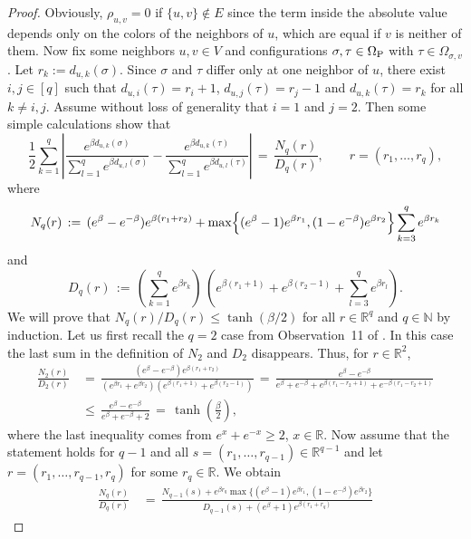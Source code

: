 \documentclass{dis}
\theoremstyle{citing}
\begin{document}
\begin{proof}
Obviously, $\rho_{u,v}=0$ if $\{u,v\}\notin E$ since the term 
inside the absolute value depends only on the colors of the 
neighbors of $u$, which are equal if $v$ is neither of them.
Now fix some neighbors $u,v\in V$ and configurations 
$\sigma,\tau\in{{\Omega}_{\rm P}}$ with $\tau\in{\Omega}_{\sigma,v}$.
Let $r_k:=d_{u,k}(\sigma)$. Since $\sigma$ and $\tau$ differ only 
at one neighbor of $u$, there exist $i,j\in[q]$ such that 
$d_{u,i}(\tau)=r_i+1$, $d_{u,j}(\tau)=r_j-1$ and 
$d_{u,k}(\tau)=r_k$ for all $k\neq i,j$. 
Assume without loss of generality that $i=1$ and $j=2$. Then some simple 
calculations show that
\[
\frac12 \sum_{k=1}^q {\left\vert {
	\frac{e^{\beta d_{u,k}(\sigma)}}
		{\sum_{l=1}^q e^{\beta d_{u,l}(\sigma)}} -
	\frac{e^{\beta d_{u,k}(\tau)}}
		{\sum_{l=1}^q e^{\beta d_{u,l}(\tau)}}} \right\vert}
\,=\, \frac{N_q(r)}{D_q(r)}, \qquad r=(r_1,\dots,r_q),
\]
where
\[
N_q(r) \,:=\, (e^\beta-e^{-\beta}) e^{\beta(r_1+r_2)} + 
	\max\Bigl\{(e^\beta-1) e^{\beta r_1},(1-e^{-\beta}) 
	e^{\beta r_2}\Bigr\} \sum_{k=3}^q e^{\beta r_k}
\]
and
\[
D_q(r) \,:=\, \left(\sum_{k=1}^q e^{\beta r_k}\right)\,
	\left(e^{\beta(r_1+1)}+e^{\beta(r_2-1)}
	+\sum_{l=3}^q e^{\beta r_l}\right).
\]
We will prove that $N_q(r)/D_q(r)\le\tanh(\beta/2)$ 
for all $r\in{\ensuremath{\mathbb{R}}}^q$ and $q\in{\ensuremath{\mathbb{N}}}$ by induction. 
Let us first recall the $q=2$ case from Observation~11 of \cite{Ha}. 
In this case the last sum in the definition of $N_2$ and $D_2$ 
disappears. Thus, for $r\in{\ensuremath{\mathbb{R}}}^2$, 
\[\begin{split}
\frac{N_2(r)}{D_2(r)} \,&=\, 
\frac{(e^\beta-e^{-\beta}) e^{\beta(r_1+r_2)}}
	{\left(e^{\beta r_1}+e^{\beta r_2}\right)
	\left(e^{\beta(r_1+1)}+e^{\beta(r_2-1)}\right)}
\,=\, \frac{e^\beta-e^{-\beta}}
	{e^\beta+e^{-\beta} + e^{\beta(r_1-r_2+1)}+e^{-\beta(r_1-r_2+1)}}\\
&\le\, \frac{e^\beta-e^{-\beta}}
	{e^\beta+e^{-\beta} + 2} 
\,=\, \tanh\left(\frac{\beta}{2}\right),
\end{split}\]
where the last inequality comes from $e^x+e^{-x}\ge2$, $x\in{\ensuremath{\mathbb{R}}}$.
Now assume that the statement holds for $q-1$ and 
all $s=(r_1,\dots,r_{q-1})\in{\ensuremath{\mathbb{R}}}^{q-1}$ and let 
$r=(r_1,\dots,r_{q-1},r_q)$ for 
some $r_q\in{\ensuremath{\mathbb{R}}}$. We obtain
\[\begin{split}
\frac{N_q(r)}{D_q(r)} \,&=\, 
\frac{N_{q-1}(s) + e^{\beta r_q} 
		\max\bigl\{(e^\beta-1) e^{\beta r_1}, 
		(1-e^{-\beta})	e^{\beta r_2}\bigr\}}
	{D_{q-1}(s) + \left(e^{\beta}+1\right) e^{\beta (r_1+r_q)}
}
\end{split}\]
\end{proof}
\end{document}
